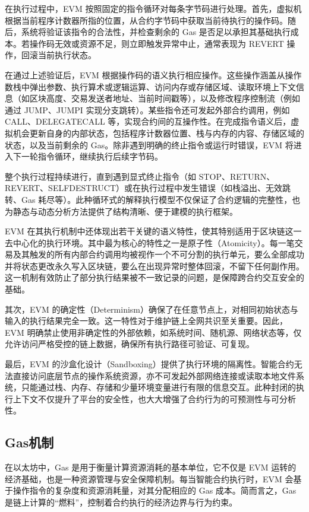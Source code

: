 \documentclass[print, master, vlined, timesmath]{DissertUESTC}
\begin{document}
在执行过程中，EVM 按照固定的指令循环对每条字节码进行处理。首先，虚拟机根据当前程序计数器所指的位置，从合约字节码中获取当前待执行的操作码。随后，系统将验证该指令的合法性，并检查剩余的 Gas 是否足以承担其基础执行成本。若操作码无效或资源不足，则立即触发异常中止，通常表现为 REVERT 操作，回滚当前执行状态。

在通过上述验证后，EVM 根据操作码的语义执行相应操作。这些操作涵盖从操作数栈中弹出参数、执行算术或逻辑运算、访问内存或存储区域、读取环境上下文信息（如区块高度、交易发送者地址、当前时间戳等），以及修改程序控制流（例如通过 JUMP、JUMPI 实现分支跳转）。某些指令还可发起外部合约调用，例如 CALL、DELEGATECALL 等，实现合约间的互操作性。在完成指令语义后，虚拟机会更新自身的内部状态，包括程序计数器位置、栈与内存的内容、存储区域的状态，以及当前剩余的 Gas。除非遇到明确的终止指令或运行时错误，EVM 将进入下一轮指令循环，继续执行后续字节码。

整个执行过程持续进行，直到遇到显式终止指令（如 STOP、RETURN、REVERT、SELFDESTRUCT）或在执行过程中发生错误（如栈溢出、无效跳转、Gas 耗尽等）。此种循环式的解释执行模型不仅保证了合约逻辑的完整性，也为静态与动态分析方法提供了结构清晰、便于建模的执行框架。

EVM 在其执行机制中还体现出若干关键的语义特性，使其特别适用于区块链这一去中心化的执行环境。其中最为核心的特性之一是原子性（Atomicity）。每一笔交易及其触发的所有内部合约调用均被视作一个不可分割的执行单元，要么全部成功并将状态更改永久写入区块链，要么在出现异常时整体回滚，不留下任何副作用。这一机制有效防止了部分执行结果被不一致记录的问题，是保障跨合约交互安全的基础。

其次，EVM 的确定性（Determinism）确保了在任意节点上，对相同初始状态与输入的执行结果完全一致。这一特性对于维护链上全网共识至关重要。因此，EVM 明确禁止使用非确定性的外部依赖，如系统时间、随机源、网络状态等，仅允许访问严格受控的链上数据，确保所有执行路径可验证、可复现。

最后，EVM 的沙盒化设计\textsuperscript{\cite{lagouvardos2025precise}}（Sandboxing）提供了执行环境的隔离性。智能合约无法直接访问底层节点的操作系统资源，亦不可发起外部网络连接或读取本地文件系统，只能通过栈、内存、存储和少量环境变量进行有限的信息交互。此种封闭的执行上下文不仅提升了平台的安全性，也大大增强了合约行为的可预测性与可分析性。

\subsection{Gas机制}

在以太坊中，Gas 是用于衡量计算资源消耗的基本单位，它不仅是 EVM 运转的经济基础，也是一种资源管理与安全保障机制。每当智能合约执行时，EVM 会基于操作指令的复杂度和资源消耗量，对其分配相应的 Gas 成本。简而言之，Gas 是链上计算的“燃料”，控制着合约执行的经济边界与行为约束。
\end{document}
